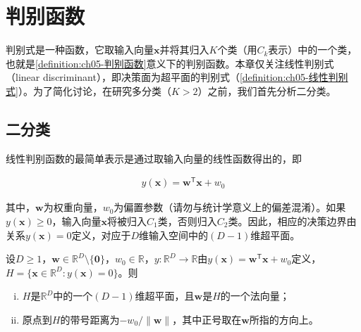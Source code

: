 \documentclass[../../main.tex]{subfiles}
\begin{document}
\section{判别函数}\label{section:ch05-判别函数}

判别式是一种函数，它取输入向量$\boldsymbol{x}$并将其归入$K$个类（用$C_k$表示）中的一个类，也就是\cref{definition:ch05-判别函数}意义下的判别函数。本章仅关注线性判别式（linear discriminant），即决策面为超平面的判别式（\cref{definition:ch05-线性判别式}）。为了简化讨论，在研究多分类（$K>2$）之前，我们首先分析二分类。

\subsection{二分类}\label{subsection:ch05-二分类}

线性判别函数的最简单表示是通过取输入向量的线性函数得出的，即

\begin{align}
  y(\boldsymbol{x})=\boldsymbol{w}^{\mathsf{T}}\boldsymbol{x}+w_0
  \label{align:ch05-线性判别}
\end{align}

其中，$\boldsymbol{w}$为权重向量，$w_0$为偏置参数（请勿与统计学意义上的偏差混淆）。如果$y(\boldsymbol{x})\geqslant 0$，输入向量$\boldsymbol{x}$将被归入$C_1$类，否则归入$C_2$类。因此，相应的决策边界由关系$y(\boldsymbol{x})=0$定义，对应于$D$维输入空间中的$(D-1)$维超平面。

\begin{proposition}[决策面的几何性质]\label{proposition:ch05-决策面几何}
设$D\geqslant1$，$\boldsymbol{w}\in\mathbb{R}^{D}\setminus\{\boldsymbol{0}\}$，$w_0\in\mathbb{R}$，$y:\mathbb{R}^{D}\to\mathbb{R}$由$y(\boldsymbol{x})=\boldsymbol{w}^{\mathsf{T}}\boldsymbol{x}+w_0$定义，$H=\{\boldsymbol{x}\in\mathbb{R}^{D}:y(\boldsymbol{x})=0\}$。则
\begin{enumerate}[(i)]
  \item $H$是$\mathbb{R}^{D}$中的一个$(D-1)$维超平面，且$\boldsymbol{w}$是$H$的一个法向量；
  \item 原点到$H$的带号距离为$-w_0/\lVert\boldsymbol{w}\rVert$，其中正号取在$\boldsymbol{w}$所指的方向上。
\end{enumerate}
\end{proposition}
\end{document}
